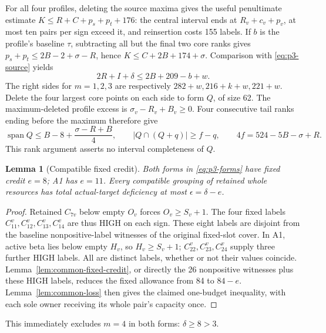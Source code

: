 \documentclass[11pt,letterpaper]{article}
\newtheorem{lemma}[theorem]{Lemma}
\theoremstyle{definition}\newtheorem{definition}[theorem]{Definition}
\begin{document}
For all four profiles, deleting the source maxima gives the useful
penultimate estimate
$K\le R+C+p_s+p_t+176$: the central interval ends at
$R_v+c_v+p_v$, at most ten pairs per sign exceed it, and reinsertion
costs 155 labels. If $b$ is the profile's baseline $\tau$, subtracting
all but the final two core ranks gives
$p_s+p_t\le2B-2+\sigma-R$, hence $K\le C+2B+174+\sigma$.
Comparison with \eqref{eq:p3-source} yields
\begin{equation}\label{eq:p3-radial}
2R+I+\delta\le2B+209-b+w.
\end{equation}
The right sides for $m=1,2,3$ are respectively
$282+w,216+k+w,221+w$.
Delete the four largest core points on each side to form $Q$, of size 62.
The maximum-deleted profile excess is $\sigma_v-R_v+B_v\ge0$.
Four consecutive tail ranks ending before the maximum therefore give
\begin{equation}\label{eq:p3-rank}
\operatorname{span}Q\le B-8+\frac{\sigma-R+B}{4},\qquad
|Q\cap(Q+q)|\ge f-q,\qquad 4f=524-5B-\sigma+R.
\end{equation}
This rank argument asserts no interval completeness of $Q$.

\begin{lemma}[Compatible fixed credit]\label{lem:p3-fixed}
Both forms in \eqref{eq:p3-forms} have fixed credit $e=8$; A1 has $e=11$.
Every compatible grouping of retained whole resources has total
actual-target deficiency at most $\epsilon=\delta-e$.
\end{lemma}
\begin{proof}
Retained $C_{7v}$ below empty $O_v$ forces $O_v\ge S_v+1$.
The four fixed labels $C^v_{11},C^v_{12},C^v_{13},C^v_{14}$ are thus
HIGH on each sign. These eight labels are disjoint from the baseline
nonpositive-label witnesses of the original fixed-slot cover.
In A1, active beta lies below empty $H_v$, so $H_v\ge S_v+1$;
$C^v_{22},C^v_{23},C^v_{24}$ supply three further HIGH labels.
All are distinct labels, whether or not their values coincide.
Lemma~\ref{lem:common-fixed-credit}, or directly the 26 nonpositive
witnesses plus these HIGH labels, reduces the fixed allowance from 84
to $84-e$. Lemma~\ref{lem:common-loss} then gives the claimed one-budget
inequality, with each sole owner receiving its whole pair's capacity once.
\end{proof}
This immediately excludes $m=4$ in both forms: $\delta\ge8>3$.
\end{document}
